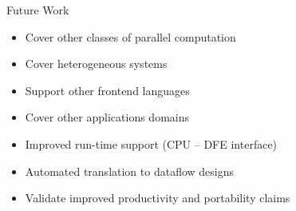 \begin{frame}{Future Work}

  \begin{itemize}
  \item Cover other classes of parallel computation

  \item Cover heterogeneous systems

  \item Support other frontend languages

  \item Cover other applications domains

  \item Improved run-time support (CPU -- DFE interface)

  \item Automated translation to dataflow designs

  \item Validate improved productivity and
    portability claims

  \end{itemize}
\end{frame}
